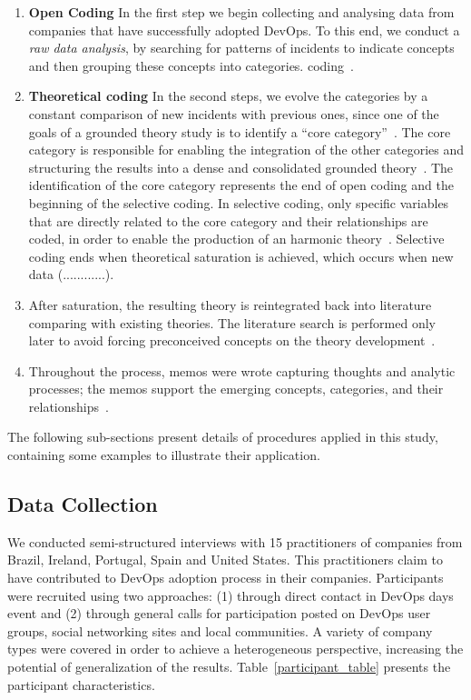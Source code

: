 \begin{enumerate}[label=(\Alph*)]
\item {\bf Open Coding} In the first step we begin collecting and analysing data from
  companies that have successfully adopted DevOps. To this end, we conduct a
  \emph{raw data analysis}, by searching for patterns of incidents to indicate concepts  and
  then grouping these concepts into categories. 
coding~\cite{stol2016grounded}.

\item {\bf Theoretical coding} In the second steps, we evolve the categories
  by a constant comparison of new incidents with previous ones, since one of the
  goals of a grounded theory study is to identify a ``core category''~\cite{stol2016grounded}.
  The core category is responsible for enabling the integration of the other
  categories and structuring the results into a dense and consolidated grounded
  theory~\cite{jantunen2014using}. The identification of the core category
  represents the end of open coding and the beginning of the selective coding.
  In selective coding, only specific variables that are directly related to the core category
  and their relationships are coded, in order to enable the production of an harmonic
  theory~\cite{coleman2007using,hoda2011impact}. Selective coding ends {\color{red}when theoretical
  saturation is achieved, which occurs when new data (............).}

\item After saturation, the resulting theory is reintegrated back into
literature comparing with existing theories. The literature search is performed
only later to avoid forcing preconceived concepts on the theory development~\cite{adolph2012reconciling}.

\item Throughout the process, memos were wrote capturing thoughts and analytic
processes; the memos support the emerging concepts, categories, and their
relationships~\cite{adolph2012reconciling}.
\end{enumerate}


The following sub-sections present details of procedures applied in this study,
containing some examples to illustrate their application.

\subsection{Data Collection}
We conducted semi-structured interviews with 15 practitioners of companies from
Brazil, Ireland, Portugal, Spain and United States. This practitioners claim
to have contributed to DevOps adoption process in their companies. Participants
were recruited using two approaches: (1) through direct contact in DevOps days event
and (2) through  general
calls for participation posted on DevOps user groups, social networking sites
and local communities. A variety of company types were covered in order to
achieve a heterogeneous perspective, increasing the potential of generalization
of the results. Table~\ref{participant_table} presents the participant
characteristics.


